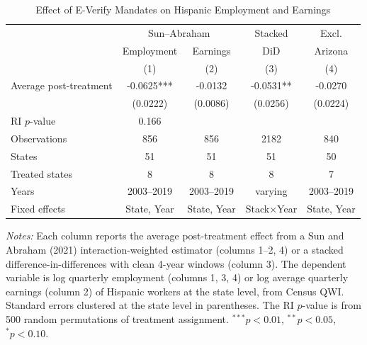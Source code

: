 \begin{table}[t]
\centering
\caption{Effect of E-Verify Mandates on Hispanic Employment and Earnings}
\label{tab:main}
\begin{tabular}{lcccc}
\hline\hline
 & \multicolumn{2}{c}{Sun--Abraham} & Stacked & Excl. \\
 & Employment & Earnings & DiD & Arizona \\
 & (1) & (2) & (3) & (4) \\
\hline
Average post-treatment & -0.0625*** & -0.0132 & -0.0531** & -0.0270 \\
 & (0.0222) & (0.0086) & (0.0256) & (0.0224) \\[6pt]
RI $p$-value & 0.166 & & & \\[6pt]
Observations & 856 & 856 & 2182 & 840 \\
States & 51 & 51 & 51 & 50 \\
Treated states & 8 & 8 & 8 & 7 \\
Years & 2003--2019 & 2003--2019 & varying & 2003--2019 \\
Fixed effects & State, Year & State, Year & Stack$\times$Year & State, Year \\
\hline\hline
\end{tabular}
\begin{tablenotes}
\small
\item \textit{Notes:} Each column reports the average post-treatment effect from a Sun and Abraham (2021) interaction-weighted estimator (columns 1--2, 4) or a stacked difference-in-differences with clean 4-year windows (column 3). The dependent variable is log quarterly employment (columns 1, 3, 4) or log average quarterly earnings (column 2) of Hispanic workers at the state level, from Census QWI. Standard errors clustered at the state level in parentheses. The RI $p$-value is from 500 random permutations of treatment assignment. $^{***}p<0.01$, $^{**}p<0.05$, $^{*}p<0.10$.
\end{tablenotes}
\end{table}

